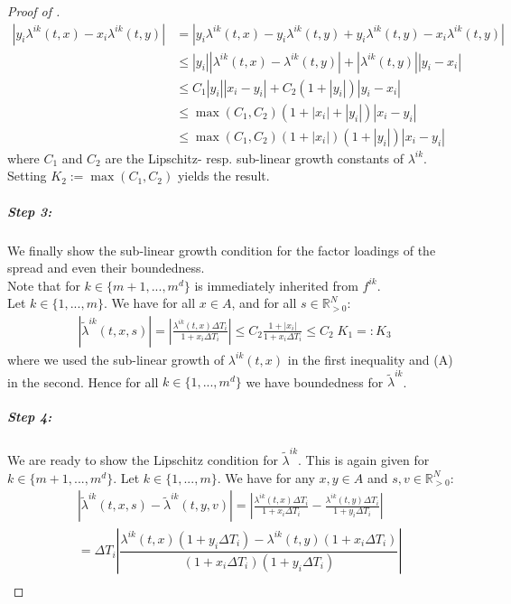\documentclass[12pt]{article}
\begin{document}
\begin{proof}[Proof of ]
\begin{align*}
			\left| y_i \lambda^{ik}(t, x) - x_i \lambda^{ik}(t,y) \right| &= \left| y_i \lambda^{ik}(t, x) - y_i \lambda^{ik}(t,y) + y_i \lambda^{ik}(t,y) - x_i \lambda^{ik}(t,y) \right|\\
			&\le \left| y_i \right| \left|\lambda^{ik}(t, x) - \lambda^{ik}(t,y) \right|+ \left|\lambda^{ik}(t,y)\right| \left|y_i - x_i\right|\\
			& \le C_1 \left| y_i \right| \left|x_i - y_i\right|+ C_2\left(1 + \left|y_i\right|\right) \left|y_i - x_i\right|\\
			&\le \max\left(C_1, C_2\right) \left(1 + \left|x_i\right| + \left| y_i \right| \right) \left|x_i - y_i\right|\\
			&\le \max\left(C_1, C_2\right) \left(1 + \left|x_i\right|\right) \left( 1 +\left| y_i \right| \right) \left|x_i - y_i\right|
		\end{align*}
		where $C_1$ and $C_2$ are the Lipschitz- resp. sub-linear growth constants of $\lambda^{i k}$. Setting $K_2:=\max\left(C_1, C_2\right)$ yields  the result.
		\subparagraph{Step 3:}
		We finally show the sub-linear growth condition for the factor loadings of the spread and even their boundedness.\\
		Note that for $k\in\{m+1, ..., m^d\}$ is immediately inherited from $f^{i k}$.\\
		Let $k\in\{1,...,m\}$. We have for all $x \in A$, and for all $s\in \mathbb{R}_{>0}^N$:
		\begin{align*}
			\left|\tilde{\lambda}^{i k}\left(t,x, s\right)\right| = \left|\frac{\lambda^{i k}(t,x) \Delta T_i}{1 + x_i\Delta T_i}\right|\le C_2 \frac{1+|x_i|}{1+x_i\Delta T_i}\le C_2\;K_1=:K_3\tag{C}
		\end{align*}
		where we used the sub-linear growth of $\lambda^{ik}(t,x)$ in the first inequality and (A) in the second. Hence for all $k\in\{1,..., m^d\}$ we have boundedness for $\tilde{\lambda}^{ik}$.
		\subparagraph{Step 4:}
		We are ready to show the Lipschitz condition for $\tilde{\lambda}^{ik}$. This is again given for $k\in\{m+1, ..., m^d\}$. Let $k\in\{1, ..., m\}$. We have for any $x,y \in A$ and $s,v \in \mathbb{R}_{>0}^N$:
		\begin{align*}
			&\left|\tilde{\lambda}^{ik}(t,x,s) - \tilde{\lambda}^{ik}(t,y,v)\right| = \left|\frac{\lambda^{i k}(t,x) \Delta T_i}{1 + x_i\Delta T_i} - \frac{\lambda^{i k}(t,y) \Delta T_i}{1 + y_i\Delta T_i}\right| \\
			&= \Delta T_i \left|\dfrac{\lambda^{i k}(t,x)\left(1 + y_i\Delta T_i\right) - \lambda^{i k}(t,y)\left(1 + x_i\Delta T_i\right)}{\left(1 + x_i\Delta T_i\right)\left(1 + y_i\Delta T_i\right)}\right|\\

\end{align*}
\end{proof}
\end{document}
